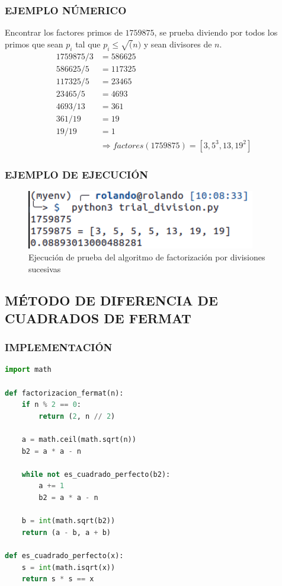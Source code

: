 \subsubsection{EJEMPLO NÚMERICO}
Encontrar los factores primos de $1759875$, se prueba diviendo por todos los primos que sean $p_i$ tal que $p_i \leq \sqrt(n)$ y sean divisores de $n$.
\begin{align*} 
    1759875 / 3 & = 586625 \\
    586625 / 5 & = 117325 \\
    117325 / 5 & = 23465 \\
    23465 / 5 & =  4693\\
    4693 / 13 & =  361\\
    361 / 19 & =  19\\
    19 / 19 & =  1\\
    &\Rightarrow factores(1759875) = [3, 5^3, 13, 19^2]
\end{align*}

\subsubsection{EJEMPLO DE EJECUCIÓN}
\begin{figure}[H]
    \centering
    \includegraphics[width=10cm]{images/trial_divition_prueba.png}
    \caption{Ejecución de prueba del algoritmo de factorización por divisiones sucesivas}
\end{figure}


\subsection{MÉTODO DE DIFERENCIA DE CUADRADOS DE FERMAT}
\subsubsection{IMPLEMENTACIÓN}
\begin{lstlisting}[language=Python]
import math

def factorizacion_fermat(n):
    if n % 2 == 0:
        return (2, n // 2)

    a = math.ceil(math.sqrt(n))
    b2 = a * a - n

    while not es_cuadrado_perfecto(b2):
        a += 1
        b2 = a * a - n

    b = int(math.sqrt(b2))
    return (a - b, a + b)

def es_cuadrado_perfecto(x):
    s = int(math.isqrt(x))
    return s * s == x
\end{lstlisting}

